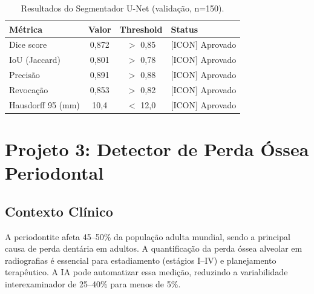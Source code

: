 \begin{table}[H]
  \centering
  \caption{Resultados do Segmentador U-Net (validação, n=150).}
  \label{tab:unet-results}
  \begin{tabularx}{\textwidth}{lccX}
    \toprule
    \textbf{Métrica} & \textbf{Valor} & \textbf{Threshold} & \textbf{Status} \\
    \midrule
    Dice score & 0,872 & $>$ 0,85 & \textcolor{corTesteSucesso}{[ICON] Aprovado} \\
    IoU (Jaccard) & 0,801 & $>$ 0,78 & \textcolor{corTesteSucesso}{[ICON] Aprovado} \\
    Precisão & 0,891 & $>$ 0,88 & \textcolor{corTesteSucesso}{[ICON] Aprovado} \\
    Revocação & 0,853 & $>$ 0,82 & \textcolor{corTesteSucesso}{[ICON] Aprovado} \\
    Hausdorff 95 (mm) & 10,4 & $<$ 12,0 & \textcolor{corTesteSucesso}{[ICON] Aprovado} \\
    \bottomrule
  \end{tabularx}
\end{table}



\section{Projeto 3: Detector de Perda Óssea Periodontal}

\subsection{Contexto Clínico}

A periodontite afeta 45--50\% da população adulta mundial, sendo a
principal causa de perda dentária em adultos. A quantificação da perda
óssea alveolar em radiografias é essencial para estadiamento (estágios
I--IV) e planejamento terapêutico. A IA pode automatizar essa medição,
reduzindo a variabilidade interexaminador de 25--40\% para menos de 5\%.

